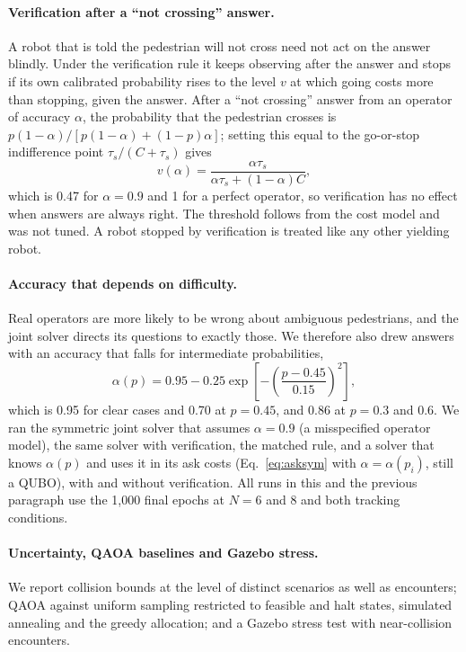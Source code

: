 \documentclass[a4paper,fleqn]{cas-dc}
\begin{document}
\paragraph{Verification after a ``not crossing'' answer.} A robot that is told the pedestrian will not cross need not act on the answer blindly. Under the verification rule it keeps observing after the answer and stops if its own calibrated probability rises to the level $v$ at which going costs more than stopping, given the answer. After a ``not crossing'' answer from an operator of accuracy $\alpha$, the probability that the pedestrian crosses is $p(1-\alpha)/[p(1-\alpha)+(1-p)\alpha]$; setting this equal to the go-or-stop indifference point $\tau_s/(C+\tau_s)$ gives
\begin{equation}
v(\alpha) = \frac{\alpha\tau_s}{\alpha\tau_s + (1-\alpha)C},
\label{eq:verify}
\end{equation}
which is 0.47 for $\alpha = 0.9$ and 1 for a perfect operator, so verification has no effect when answers are always right. The threshold follows from the cost model and was not tuned. A robot stopped by verification is treated like any other yielding robot.

\paragraph{Accuracy that depends on difficulty.} Real operators are more likely to be wrong about ambiguous pedestrians, and the joint solver directs its questions to exactly those. We therefore also drew answers with an accuracy that falls for intermediate probabilities,
\begin{equation}
\alpha(p) = 0.95 - 0.25\exp\!\left[-\left(\frac{p-0.45}{0.15}\right)^{2}\right],
\label{eq:alphad}
\end{equation}
which is 0.95 for clear cases and 0.70 at $p = 0.45$, and 0.86 at $p = 0.3$ and $0.6$. We ran the symmetric joint solver that assumes $\alpha = 0.9$ (a misspecified operator model), the same solver with verification, the matched rule, and a solver that knows $\alpha(p)$ and uses it in its ask costs (Eq.~\eqref{eq:asksym} with $\alpha = \alpha(p_i)$, still a QUBO), with and without verification. All runs in this and the previous paragraph use the 1{,}000 final epochs at $N = 6$ and 8 and both tracking conditions.

\paragraph{Uncertainty, QAOA baselines and Gazebo stress.} We report collision bounds at the level of distinct scenarios as well as encounters; QAOA against uniform sampling restricted to feasible and halt states, simulated annealing and the greedy allocation; and a Gazebo stress test with near-collision encounters.
\end{document}
